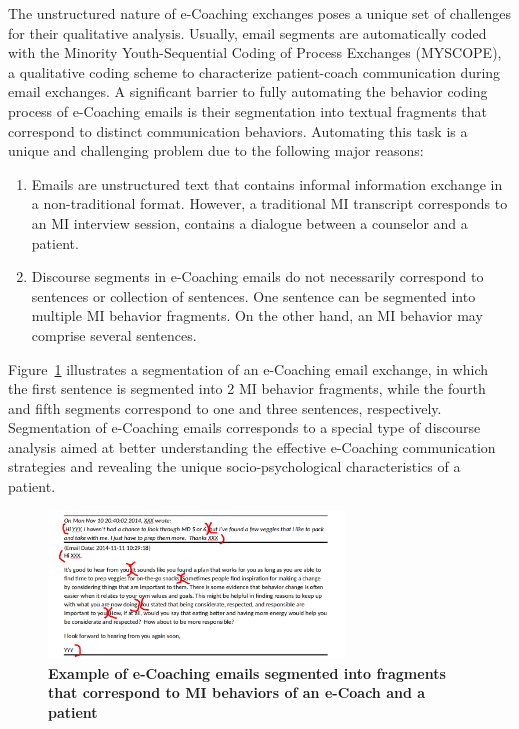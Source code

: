 \documentclass{amia}
\begin{document}
The unstructured nature of e-Coaching exchanges poses a unique set of challenges for their qualitative analysis. Usually, email segments are automatically coded with the Minority Youth-Sequential Coding of Process Exchanges (MYSCOPE), \cite{carcone2013provider} a qualitative coding scheme to characterize patient-coach communication during email exchanges. A significant barrier to fully automating the behavior coding process of e-Coaching emails is their segmentation into textual fragments that correspond to distinct communication behaviors. Automating this task is a unique and challenging problem due to the following major reasons:

\begin{enumerate}
\item Emails are unstructured text that contains informal information exchange in a non-traditional format. However, a traditional MI transcript corresponds to an MI interview
session, contains a dialogue between a counselor and a patient.
\item Discourse segments in e-Coaching emails do not necessarily correspond to sentences or collection of sentences. One sentence can be segmented into multiple MI behavior fragments. On the other hand, an MI behavior may comprise several sentences.
\end{enumerate}

Figure~\ref{fig:text-segment} illustrates a segmentation of an e-Coaching email exchange, in which the first sentence is segmented into 2 MI behavior fragments, while the fourth and fifth segments correspond to one and three sentences, respectively. Segmentation of e-Coaching emails corresponds to a special type of discourse analysis \cite{webber2012discourse} aimed at better understanding the effective e-Coaching communication strategies and revealing the unique socio-psychological characteristics of a patient.

\begin{figure}[!htb]
    \centering
    \includegraphics[width=0.7\textwidth]{figures/segment-example.png}
    \caption{\textbf{Example of e-Coaching emails segmented into fragments that correspond to MI behaviors of an e-Coach and a patient}}
    \label{fig:text-segment}
\end{figure}
\end{document}
